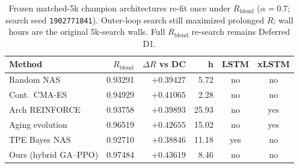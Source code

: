 \begin{table}[t]
  \centering
  \caption{Frozen matched-5k champion architectures re-fit once under $R_{\mathrm{blend}}$ ($\alpha{=}0.7$; search seed \texttt{1902771841}). Outer-loop search still maximized prolonged $R$; wall hours are the original 5k-search walls. Full $R_{\mathrm{blend}}$ re-search remains Deferred D1.}
  \label{tab:meta-approaches}
  \setlength{\tabcolsep}{2pt}
  \scriptsize
  \begin{tabular}{@{}lrrrcc@{}}
    \toprule
    Method & $R_{\mathrm{blend}}$ & $\Delta R$ vs DC & h & LSTM & xLSTM \\
    \midrule
    Random NAS & 0.93291 & $+0.39427$ & 5.72 & no & no \\
    Cont.\ CMA-ES & 0.94929 & $+0.41065$ & 2.28 & no & no \\
    Arch REINFORCE & 0.93758 & $+0.39893$ & 25.93 & no & yes \\
    Aging evolution & 0.96519 & $+0.42655$ & 15.02 & no & yes \\
    TPE Bayes NAS & 0.92710 & $+0.38846$ & 11.18 & yes & no \\
    Ours (hybrid GA--PPO) & 0.97484 & $+0.43619$ & 8.46 & no & no \\
    \bottomrule
  \end{tabular}
\end{table}
